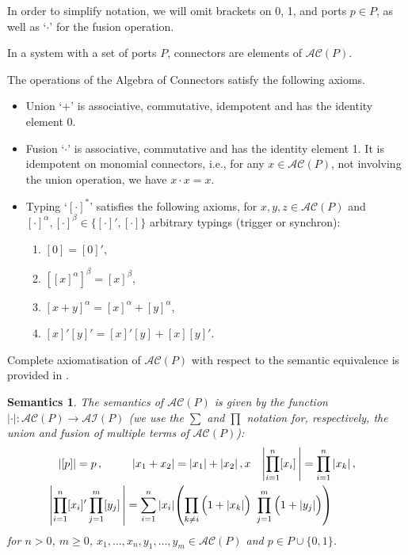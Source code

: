 \documentclass{llncs}
\newcommand{\ie}[1][\ ]{i.e.#1}
\newtheorem*{semantics}{Semantics}
\newcommand{\ai}{\ensuremath{\mathcal{AI}}}
\newcommand{\ac}{\ensuremath{\mathcal{AC}}}
\begin{document}
In order to simplify notation, we will omit brackets on 0, 1, and
ports $p \in P$, as well as `$\cdot$' for the fusion operation.

\begin{definition}
 In a system with a set of ports $P$, connectors are elements of $\ac(P)$.
\end{definition} 

The operations of the Algebra of Connectors satisfy the following
axioms.
\begin{itemize}
\item Union `$+$' is associative, commutative, idempotent and has the identity element 0.
\item Fusion `$\cdot$' is associative, commutative and has the identity element 1. It is idempotent on monomial connectors, \ie[,] for any $x \in \ac(P)$, not involving the union operation, we have $x\cdot x = x$.
\item Typing `$[\cdot]^*$' satisfies the following axioms, for $x,y,z
  \in \ac(P)$ and $[\cdot]^\alpha,[\cdot]^\beta \in \bigl\{[\cdot]', [\cdot]\bigr\}$ arbitrary typings (trigger or synchron):
  \begin{enumerate}
  \item $[0] = [0]'$,
  \item $[[x]^\alpha]^\beta = [x]^\beta$,
  \item $[x + y]^\alpha = [x]^\alpha + [y]^\alpha$,
  \item $[x]'[y]' = [x]'[y] + [x][y]'$.
  \end{enumerate}
\end{itemize}
Complete axiomatisation of $\ac(P)$ with respect to the semantic
equivalence is provided in \cite{BliSif08-acp-tc}.

\begin{semantics}
The semantics of $\ac(P)$ is given by the function $|\cdot| : \ac(P)
\rightarrow \ai(P)$ (we use the $\sum$ and $\prod$ notation for,
respectively, the union and fusion of multiple terms of $\ac(P)$):
%
\begin{align}
  \label{eq:acap}
  |[p]| & = p\,,
  & |x_1 + x_2| & = |x_1| + |x_2|\,,x
  & \left|\prod_{i=1}^n [x_i]\,\right| & = \prod_{i=1}^n |x_k|\,,
  \\
  \label{eq:acaptrig}
  && \hspace{-2cm}\left|\prod_{i=1}^n [x_i]' \prod_{j=1}^m [y_j]\,\right| = 
  \sum_{i=1}^n |x_i| & \lefteqn{\left(
  \prod_{k\not=i}\Big(1 + |x_k|\Big)\ \prod_{j=1}^m \Big(1 + |y_j|\Big)\right)}\,
\end{align}
%
for $n > 0$, $m \geq 0$, $x_1,\dots,x_n,y_1,\dots,y_m \in \ac(P)$ and
$p\in P\cup \{0,1\}$.
\end{semantics}
\end{document}
